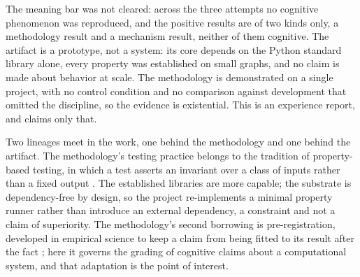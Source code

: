 \documentclass[conference]{IEEEtran}
\begin{document}
The meaning bar was not cleared: across the three attempts no cognitive phenomenon was
reproduced, and the positive results are of two kinds only, a methodology result and a mechanism
result, neither of them cognitive. The artifact is a prototype, not a system: its core depends
on the Python standard library alone, every property was established on small graphs, and no
claim is made about behavior at scale. The methodology is demonstrated on a single project, with
no control condition and no comparison against development that omitted the discipline, so the
evidence is existential. This is an experience report, and claims only that.

Two lineages meet in the work, one behind the methodology and one behind the artifact. The
methodology's testing practice belongs to the tradition of property-based testing, in which a
test asserts an invariant over a class of inputs rather than a fixed output
\cite{claessen2000quickcheck, maciver2019hypothesis}. The established libraries are more capable;
the substrate is dependency-free by design, so the project re-implements a minimal property
runner rather than introduce an external dependency, a constraint and not a claim of superiority.
The methodology's second borrowing is pre-registration, developed in empirical science to keep a
claim from being fitted to its result after the fact \cite{nosek2018preregistration}; here it
governs the grading of cognitive claims about a computational system, and that adaptation is the
point of interest.
\end{document}
